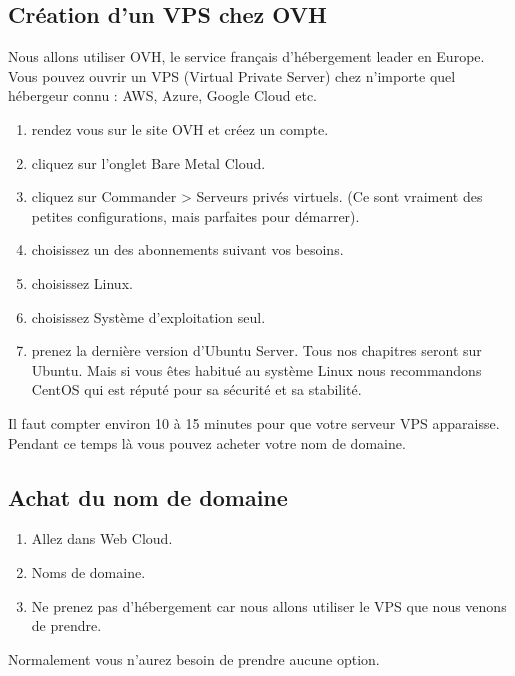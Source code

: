 \documentclass{article}
\begin{document}
\subsection{Création d'un VPS chez OVH}  
Nous allons utiliser OVH, le service français d'hébergement leader en Europe. Vous pouvez ouvrir un VPS (Virtual Private Server) chez n'importe quel hébergeur connu : AWS, Azure, Google Cloud etc.
\begin{enumerate}
    \item rendez vous sur le site OVH et créez un compte.

    \item cliquez sur l'onglet Bare Metal Cloud.

    \item cliquez sur Commander > Serveurs privés virtuels. (Ce sont vraiment des petites configurations, mais parfaites pour démarrer).

    \item choisissez un des abonnements suivant vos besoins.

    \item choisissez Linux.

    \item choisissez Système d'exploitation seul.

    \item prenez la dernière version d'Ubuntu Server. Tous nos chapitres seront sur Ubuntu. Mais si vous êtes habitué au système Linux nous recommandons CentOS qui est réputé pour sa sécurité et sa stabilité.
\end{enumerate}


Il faut compter environ 10 à 15 minutes pour que votre serveur VPS apparaisse. Pendant ce temps là vous pouvez acheter votre nom de domaine.

\subsection{Achat du nom de domaine}
\begin{enumerate}
    \item  Allez dans Web Cloud.

    \item  Noms de domaine.

    \item  Ne prenez pas d'hébergement car nous allons utiliser le VPS que nous venons de prendre.
\end{enumerate}
Normalement vous n'aurez besoin de prendre aucune option.
\end{document}
